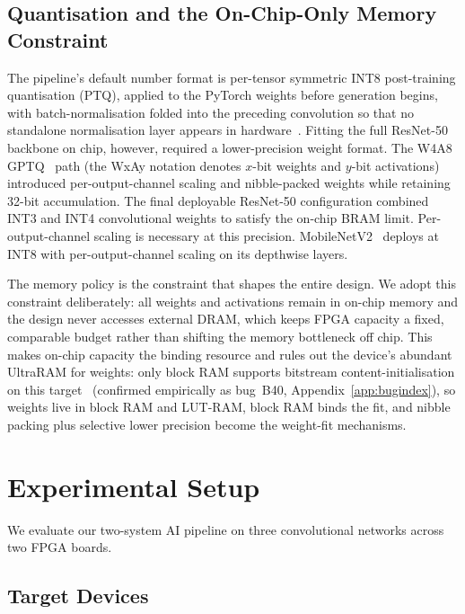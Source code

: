 \documentclass[acmtog,authorversion]{acmart}
\begin{document}
\subsection{Quantisation and the On-Chip-Only Memory Constraint}
\label{sec:quant}

The pipeline's default number format is per-tensor symmetric INT8 post-training quantisation (PTQ), applied to the PyTorch weights before generation begins, with batch-normalisation folded into the preceding convolution so that no standalone normalisation layer appears in hardware~\cite{jacob2018}. Fitting the full ResNet-50~\cite{he2016} backbone on chip, however, required a lower-precision weight format. The W4A8 GPTQ~\cite{frantar2023} path (the WxAy notation denotes $x$-bit weights and $y$-bit activations) introduced per-output-channel scaling and nibble-packed weights while retaining 32-bit accumulation. The final deployable ResNet-50 configuration combined INT3 and INT4 convolutional weights to satisfy the on-chip BRAM limit. Per-output-channel scaling is necessary at this precision. MobileNetV2~\cite{sandler2018} deploys at INT8 with per-output-channel scaling on its depthwise layers.

The memory policy is the constraint that shapes the entire design. We adopt this constraint deliberately: all weights and activations remain in on-chip memory and the design never accesses external DRAM, which keeps FPGA capacity a fixed, comparable budget rather than shifting the memory bottleneck off chip. This makes on-chip capacity the binding resource and rules out the device's abundant UltraRAM for weights: only block RAM supports bitstream content-initialisation on this target~\cite{amd_ug573} (confirmed empirically as bug~B40, Appendix~\ref{app:bugindex}), so weights live in block RAM and LUT-RAM, block RAM binds the fit, and nibble packing plus selective lower precision become the weight-fit mechanisms.

\section{Experimental Setup}\label{sec:setup}

We evaluate our two-system AI pipeline on three convolutional networks across two FPGA boards.

\subsection{Target Devices}
\end{document}
